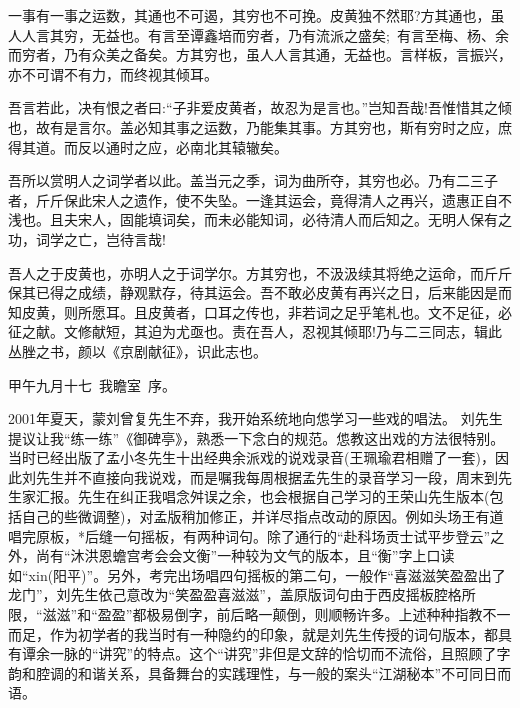 \newpage
\renewcommand{\thefootnote}{\roman{footnote}}
\setcounter{footnote}{0}
\pagestyle{fancy}    %


一事有一事之运数，其通也不可遏，其穷也不可挽。皮黄独不然耶?方其通也，虽人人言其穷，无益也。有言至谭鑫培而穷者，乃有流派之盛矣;~有言至梅、杨、余而穷者，乃有众美之备矣。方其穷也，虽人人言其通，无益也。言样板，言振兴，亦不可谓不有力，而终视其倾耳。

吾言若此，决有恨之者曰:``子非爱皮黄者，故忍为是言也。''岂知吾哉!吾惟惜其之倾也，故有是言尔。盖必知其事之运数，乃能集其事。方其穷也，斯有穷时之应，庶得其道。而反以通时之应，必南北其辕辙矣。

吾所以赏明人之词学者以此。盖当元之季，词为曲所夺，其穷也必。乃有二三子者，斤斤保此宋人之遗作，使不失坠。一逢其运会，竟得清人之再兴，遗惠正自不浅也。且夫宋人，固能填词矣，而未必能知词，必待清人而后知之。无明人保有之功，词学之亡，岂待言哉!

吾人之于皮黄也，亦明人之于词学尔。方其穷也，不汲汲续其将绝之运命，而斤斤保其已得之成绩，静观默存，待其运会。吾不敢必皮黄有再兴之日，后来能因是而知皮黄，则所愿耳。且皮黄者，口耳之传也，非若词之足乎笔札也。文不足征，必征之献。文修献短，其迫为尤亟也。责在吾人，忍视其倾耶!乃与二三同志，辑此丛脞之书，颜以《京剧献征》，识此志也。

\begin{flushright}
甲午九月十七~我瞻室~序。
\end{flushright}


\newpage
\renewcommand{\thefootnote}{\roman{footnote}}
\setcounter{footnote}{1}

\textrm{2001}年夏天，蒙刘曾复先生不弃，我开始系统地向怹学习一些戏的唱法。%
刘先生提议让我``练一练''《御碑亭》，熟悉一下念白的规范。怹教这出戏的方法很特别。当时已经出版了孟小冬先生十出经典余派戏的说戏录音(王珮瑜君相赠了一套)，因此刘先生并不直接向我说戏，而是嘱我每周根据孟先生的录音学习一段，周末到先生家汇报。先生在纠正我唱念舛误之余，也会根据自己学习的王荣山先生版本(包括自己的些微调整)，对孟版稍加修正，并详尽指点改动的原因。例如头场王有道唱完原板，*后缝一句摇板，有两种词句。除了通行的``赴科场贡士试平步登云''之外，尚有``沐洪恩蟾宫考会会文衡''一种较为文气的版本，且``衡''字上口读如``xin(阳平)''。另外，考完出场唱四句摇板的第二句，一般作``喜滋滋笑盈盈出了龙门''，刘先生依己意改为``笑盈盈喜滋滋''，盖原版词句由于西皮摇板腔格所限，``滋滋''和``盈盈''都极易倒字，前后略一颠倒，则顺畅许多。上述种种指教不一而足，作为初学者的我当时有一种隐约的印象，就是刘先生传授的词句版本，都具有谭余一脉的``讲究''的特点。这个``讲究''非但是文辞的恰切而不流俗，且照顾了字韵和腔调的和谐关系，具备舞台的实践理性，与一般的案头``江湖秘本''不可同日而语。

